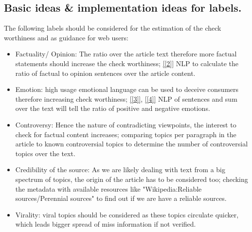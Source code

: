 \documentclass[10pt]{article}
\begin{document}
\subsection{Basic ideas \& implementation ideas for labels.}
The following labels should be considered for the estimation of the check worthiness and as guidance for web users:
\begin{itemize}
\item Factuality/ Opinion: The ratio over the article text therefore more factual statements should increase the check worthiness;
\ref{[2]} NLP to calculate the ratio of factual to opinion sentences over the article content.
\item Emotion: high usage emotional language can be used to deceive consumers therefore increasing check worthiness;
\ref{[3]}, \ref{[4]} NLP of sentences and sum over the text will tell the ratio of positive and negative emotions.
\item Controversy: Hence the nature of contradicting viewpoints, the interest to check for factual content increases;
comparing topics per paragraph in the article to known controversial topics to determine the number of controversial topics over the text.
\item Credibility of the source: As we are likely dealing with text from a big spectrum of topics, the origin of the article has to be considered too;
checking the metadata with available resources like "Wikipedia:Reliable sources/Perennial sources" to find out if we are have a reliable sources.
\item Virality: viral topics should be considered as these topics circulate quicker, which leads bigger spread of miss information if not verified.
\end{itemize}


\end{document}
